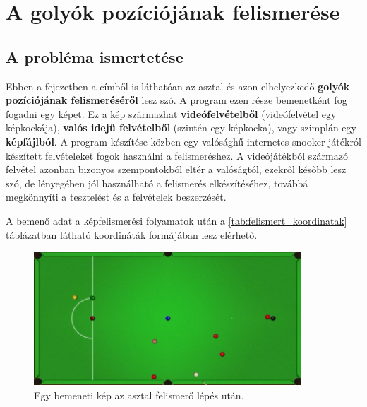 \chapter{A golyók pozíciójának felismerése}
\section{A probléma ismertetése}
Ebben a fejezetben a címből is láthatóan az asztal és azon elhelyezkedő \textbf{golyók pozíciójának felismeréséről} lesz szó. A program ezen része bemenetként fog fogadni egy képet. Ez a kép származhat \textbf{videófelvételből} (videófelvétel egy képkockája), \textbf{valós idejű felvételből} (szintén egy képkocka), vagy szimplán egy \textbf{képfájlból}. A program készítése közben egy valósághű internetes snooker játékról\cite{flyordie} készített felvételeket fogok használni a felismeréshez. A videójátékból származó felvétel azonban bizonyos szempontokból eltér a valóságtól, ezekről később lesz szó, de lényegében jól használható a felismerés elkészítéséhez, továbbá megkönnyíti a tesztelést és a felvételek beszerzését.

\par A bemenő adat a képfelismerési folyamatok után a \ref{tab:felismert_koordinatak} táblázatban látható koordináták formájában lesz elérhető.

\begin{figure}[!ht]
    \centering
    \includegraphics[width=100mm, keepaspectratio]{figures/input_table.png}
    \caption{Egy bemeneti kép az asztal felismerő lépés után.}
    \label{fig:bemeneti_asztal}
\end{figure}

